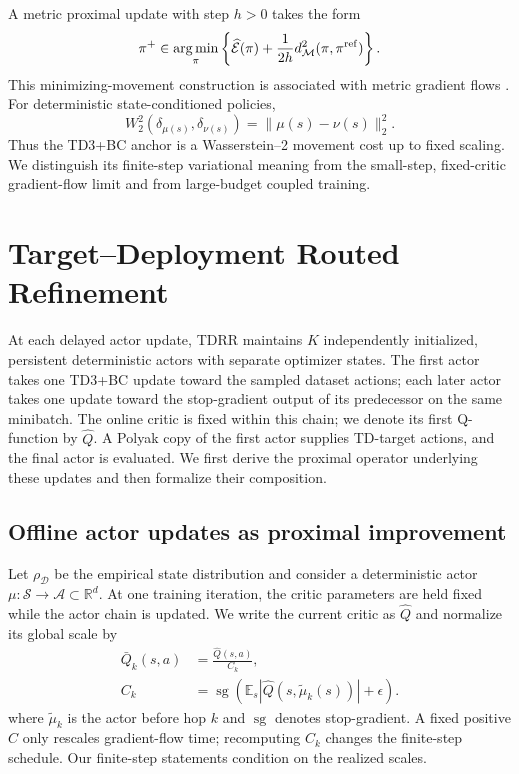 \documentclass[letterpaper]{article}
\DeclareMathOperator*{\argmin}{arg\,min}
\begin{document}
A metric proximal update with step $h>0$ takes the form
\begin{equation}
\pi^+\in\argmin_\pi\left\{\widehat{\mathcal E}(\pi)
+\frac{1}{2h}d_{\mathcal M}^2(\pi,\pi^{\rm ref})\right\}.
\label{eq:generic_prox}
\end{equation}
This minimizing-movement construction is associated with metric gradient
flows \citep{ambrosio2005gradient,otto2001geometry}. For deterministic
state-conditioned policies,
\begin{equation}
W_2^2(\delta_{\mu(s)},\delta_{\nu(s)})=\|\mu(s)-\nu(s)\|_2^2.
\label{eq:dirac_w2_background}
\end{equation}
Thus the TD3+BC anchor is a Wasserstein--2 movement cost up to fixed scaling.
We distinguish its finite-step variational meaning from the small-step,
fixed-critic gradient-flow limit and from large-budget coupled training.

\section{Target--Deployment Routed Refinement}
\label{sec:method}

At each delayed actor update, TDRR maintains $K$ independently initialized,
persistent deterministic actors with separate optimizer states. The first
actor takes one TD3+BC update toward the sampled dataset actions; each later
actor takes one update toward the stop-gradient output of its predecessor on
the same minibatch. The online critic is fixed within this chain; we denote its first Q-function by
$\widehat Q$. A Polyak copy of the first actor supplies TD-target
actions, and the final actor is evaluated. We first derive the proximal
operator underlying these updates and then formalize their composition.
\subsection{Offline actor updates as proximal improvement}

Let $\rho_{\mathcal D}$ be the empirical state distribution and consider a
deterministic actor $\mu:\mathcal S\rightarrow\mathcal A\subset\mathbb R^d$.
At one training iteration, the critic parameters are held fixed while the actor
chain is updated. We write the current critic as $\widehat Q$ and normalize its
global scale by
\begin{equation}
\begin{aligned}
 \bar Q_k(s,a)&=\frac{\widehat Q(s,a)}{C_k},\\
 C_k&=\operatorname{sg}\!\left(
 \mathbb E_s|\widehat Q(s,\widetilde\mu_k(s))|+\epsilon\right).
\end{aligned}
\label{eq:qnorm}
\end{equation}
where $\widetilde\mu_k$ is the actor before hop $k$ and
$\operatorname{sg}$ denotes stop-gradient. A fixed positive $C$ only rescales
gradient-flow time; recomputing $C_k$ changes the finite-step schedule. Our
finite-step statements condition on the realized scales.
\end{document}
